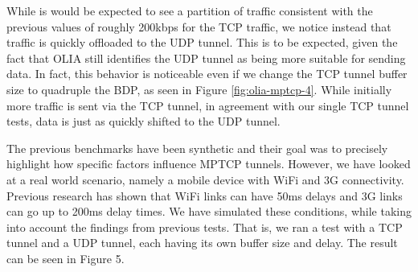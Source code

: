 While is would be expected to see a partition of traffic consistent with the
previous values of roughly 200kbps for the TCP traffic, we notice instead that
traffic is quickly offloaded to the UDP tunnel. This is to be expected, given
the fact that OLIA still identifies the UDP tunnel as being more suitable for
sending data. In fact, this behavior is noticeable even if we change the TCP
tunnel buffer size to quadruple the BDP, as seen in Figure
\ref{fig:olia-mptcp-4}. While initially more traffic is sent via the TCP
tunnel, in agreement with our single TCP tunnel tests, data is just as quickly
shifted to the UDP tunnel.

The previous benchmarks have been synthetic and their goal was to precisely
highlight how specific factors influence MPTCP tunnels. However, we have
looked at a real world scenario, namely a mobile device with WiFi and 3G
connectivity. Previous research\cite{latencies} has shown that WiFi links can
have 50ms delays and 3G links can go up to 200ms delay times. We have
simulated these conditions, while taking into account the findings from
previous tests. That is, we ran a test with a TCP tunnel and a UDP tunnel,
each having its own buffer size and delay. The result can be seen in Figure 5.

